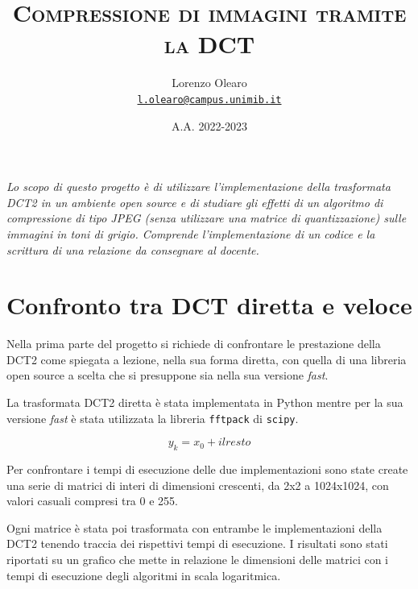 \documentclass[a4paper, 12pt]{article}
\title{\textsc{\textbf{Compressione di immagini tramite la DCT}}}
\author{
  Lorenzo Olearo \\
  \href{mailto:l.olearo@campus.unimib.it}{\texttt{\small{l.olearo@campus.unimib.it}}}}
\date{A.A. 2022-2023}
\begin{document}
\maketitle


\textit{Lo scopo di questo progetto è di utilizzare l'implementazione della trasformata
  DCT2 in un ambiente open source e di studiare gli effetti di un algoritmo di
  compressione di tipo JPEG (senza utilizzare una matrice di quantizzazione) sulle
  immagini in toni di grigio. Comprende l'implementazione di un codice e la
  scrittura di una relazione da consegnare al docente.}




\section{Confronto tra DCT diretta e veloce}
Nella prima parte del progetto si richiede di confrontare le prestazione della
DCT2 come spiegata a lezione, nella sua forma diretta, con quella di una libreria
open source a scelta che si presuppone sia nella sua versione \textit{fast}.

La trasformata DCT2 diretta è stata implementata in Python mentre per la sua
versione \textit{fast} è stata utilizzata la libreria \texttt{fftpack} di
\texttt{scipy}.

\begin{equation}
  y_k = x_0 + il resto
\end{equation}

Per confrontare i tempi di esecuzione delle due implementazioni sono state
create una serie di matrici di interi di dimensioni crescenti, da 2x2 a
1024x1024, con valori casuali compresi tra 0 e 255. 

Ogni matrice è stata poi trasformata con entrambe le implementazioni della DCT2
tenendo traccia dei rispettivi tempi di esecuzione. I risultati sono stati
riportati su un grafico che mette in relazione le dimensioni delle matrici con i
tempi di esecuzione degli algoritmi in scala logaritmica.
\end{document}
